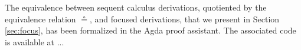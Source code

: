 \documentclass[submission,copyright,creativecommons]{eptcs}
\theoremstyle{definition}
\begin{document}

The equivalence between sequent calculus derivations, quotiented by the equivalence relation $\circeq$, and focused derivations, that we present in Section \ref{sec:focus}, has been formalized in the Agda proof assistant. The associated code is available at ...
\end{document}
